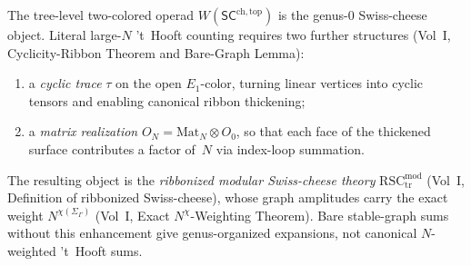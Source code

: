 \begin{remark}%
\label{rem:ribbon-trace-enhancement}%
%
%
The tree-level two-colored operad
$W(\mathsf{SC}^{\mathrm{ch,top}})$ is the genus-$0$ Swiss-cheese
object. Literal large-$N$ 't~Hooft counting requires two further
structures \textup{(}Vol~I, Cyclicity-Ribbon Theorem and Bare-Graph
Lemma\textup{)}:
\begin{enumerate}[label=\textup{(\roman*)}]
\item a \emph{cyclic trace} $\tau$ on the open
 $E_1$-color, turning linear vertices into cyclic
 tensors and enabling canonical ribbon thickening;
\item a \emph{matrix realization}
 $O_N = \mathrm{Mat}_N \otimes O_0$, so that each
 face of the thickened surface contributes a factor
 of~$N$ via index-loop summation.
\end{enumerate}
The resulting object is the \emph{ribbonized modular
Swiss-cheese theory}
$\mathrm{RSC}_{\mathrm{tr}}^{\mathrm{mod}}$
\textup{(}Vol~I, Definition of ribbonized Swiss-cheese\textup{)},
whose graph amplitudes carry the exact weight
$N^{\chi(\Sigma_\Gamma)}$ \textup{(}Vol~I, Exact
$N^{\chi}$-Weighting Theorem\textup{)}. Bare stable-graph sums
without this enhancement give genus-organized expansions, not
canonical $N$-weighted 't~Hooft sums.
\end{remark}

